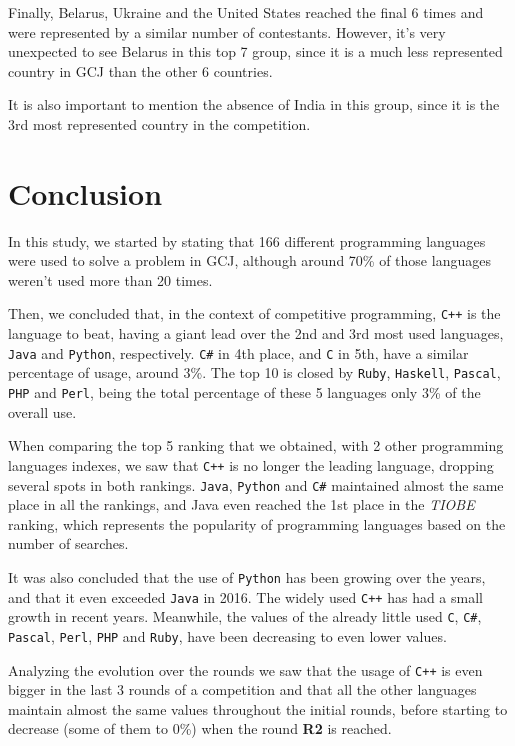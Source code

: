 \documentclass{article}
\begin{document}
\begin{multicols*}{2}
Finally, Belarus, Ukraine and the United States reached the final 6 times and were represented by a similar number of contestants. However, it's very unexpected to see Belarus in this top 7 group, since it is a much less represented country in GCJ than the other 6 countries.

It is also important to mention the absence of India in this group, since it is the 3rd most represented country in the competition.

\section{Conclusion}

In this study, we started by stating that 166 different programming languages were used to solve a problem in GCJ, although around 70\% of those languages weren't used more than 20 times.

Then, we concluded that, in the context of competitive programming, \texttt{C++} is the language to beat, having a giant lead over the 2nd and 3rd most used languages, \texttt{Java} and \texttt{Python}, respectively. \texttt{C\#} in 4th place, and \texttt{C} in 5th, have a similar percentage of usage, around 3\%. The top 10 is closed by \texttt{Ruby}, \texttt{Haskell}, \texttt{Pascal}, \texttt{PHP} and \texttt{Perl}, being the total percentage of these 5 languages only 3\% of the overall use.

When comparing the top 5 ranking that we obtained, with 2 other programming languages indexes, we saw that \texttt{C++} is no longer the leading language, dropping several spots in both rankings. \texttt{Java}, \texttt{Python} and \texttt{C\#} maintained almost the same place in all the rankings, and Java even reached the 1st place in the \textit{TIOBE} ranking, which represents the popularity of programming languages based on the number of searches.

It was also concluded that the use of \texttt{Python} has been growing over the years, and that it even exceeded \texttt{Java} in 2016. The widely used \texttt{C++} has had a small growth in recent years. Meanwhile, the values of the already little used \texttt{C}, \texttt{C\#}, \texttt{Pascal}, \texttt{Perl}, \texttt{PHP} and \texttt{Ruby}, have been decreasing to even lower values.

Analyzing the evolution over the rounds we saw that the usage of \texttt{C++} is even bigger in the last 3 rounds of a competition and that all the other languages maintain almost the same values throughout the initial rounds, before starting to decrease (some of them to 0\%) when the round \textbf{R2} is reached.


\end{multicols*}
\end{document}
